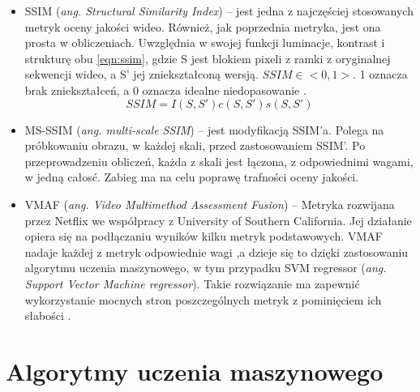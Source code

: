 \begin{itemize}[label=$\bullet$]
\item SSIM ({\em ang. Structural Similarity Index}) -- jest jedna z najczęściej stosowanych metryk oceny jakości wideo. Również, jak poprzednia metryka, jest ona prosta w obliczeniach. Uwzględnia w swojej funkcji luminacje, kontrast i strukturę obu \ref{eqn:ssim}, gdzie S jest blokiem pixeli z ramki z oryginalnej sekwencji wideo, a S' jej zniekształconą wersją. $SSIM \in <0,1>$. 1 oznacza brak zniekształceń, a 0 oznacza idealne niedopasowanie \cite{ssim_1}\cite{ssim_2}.
\begin{equation}
\label{eqn:ssim}
SSIM = I(S, S')c(S, S')s(S,S')
\end{equation}
\item MS-SSIM ({\em ang. multi-scale SSIM}) -- jest modyfikacją SSIM'a. Polega na próbkowaniu obrazu, w każdej skali, przed zastosowaniem SSIM'. Po przeprowadzeniu obliczeń, każda z skali jest łączona, z odpowiednimi wagami, w jedną całosć. Zabieg ma na celu poprawę trafności oceny jakości\cite{ssim_2}. 
\item VMAF ({\em ang. Video Multimethod Assessment Fusion}) -- Metryka rozwijana przez Netflix we współpracy z University of Southern California. Jej działanie opiera się na podłączaniu wyników kilku metryk podstawowych. VMAF nadaje każdej z metryk odpowiednie wagi ,a dzieje się to dzięki zastosowaniu algorytmu uczenia maszynowego, w tym przypadku SVM regressor ({\em ang. Support Vector Machine regressor}). Takie rozwiązanie ma zapewnić wykorzystanie mocnych stron poszczególnych metryk z pominięciem ich słabości \cite{netflix}. 
\end{itemize}

\section{Algorytmy uczenia maszynowego }

